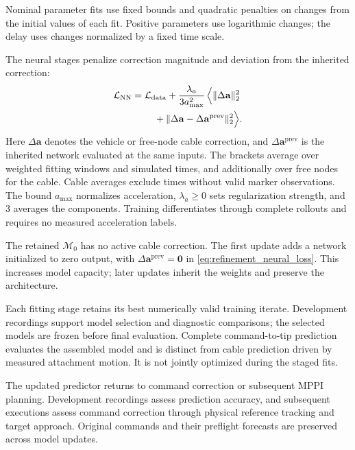 \documentclass[letterpaper, 10 pt, conference]{ieeeconf}
\begin{document}
Nominal parameter fits use fixed bounds and quadratic penalties
on changes from the initial values of each fit. Positive parameters
use logarithmic changes; the delay uses changes normalized by a
fixed time scale.

The neural stages penalize correction magnitude and deviation
from the inherited correction:
\begin{equation}
\begin{aligned}
\mathcal L_{\mathrm{NN}}
={}&\mathcal L_{\mathrm{data}}+\frac{\lambda_a}{3a_{\max}^2}\,
\Bigl\langle\|\Delta\mathbf a\|_2^2\\
&\quad+\|\Delta\mathbf a-\Delta\mathbf a^{\mathrm{prev}}\|_2^2\Bigr\rangle.
\end{aligned}
\label{eq:refinement_neural_loss}
\end{equation}
Here $\Delta\mathbf a$ denotes the vehicle or free-node cable
correction, and $\Delta\mathbf a^{\mathrm{prev}}$ is the
inherited network evaluated at the same inputs.
The brackets average over weighted fitting windows and simulated
times, and additionally over free nodes for the cable. Cable
averages exclude times without valid marker observations.
The bound $a_{\max}$ normalizes acceleration, $\lambda_a\geq0$
sets regularization strength, and $3$ averages the components.
Training differentiates through complete rollouts and requires
no measured acceleration labels.

The retained $\mathcal M_0$ has no active cable correction.
The first update adds a network initialized to zero output, with
$\Delta\mathbf a^{\mathrm{prev}}=\mathbf0$ in
\eqref{eq:refinement_neural_loss}. This increases model capacity;
later updates inherit the weights and preserve the architecture.

Each fitting stage retains its best numerically valid training
iterate. Development recordings support model selection and
diagnostic comparisons; the selected models are frozen before
final evaluation. Complete command-to-tip prediction evaluates
the assembled model and is distinct from cable prediction driven
by measured attachment motion. It is not jointly optimized during
the staged fits.

The updated predictor returns to command correction or subsequent
MPPI planning. Development recordings assess prediction accuracy,
and subsequent executions assess command correction through physical
reference tracking and target approach. Original commands and
their preflight forecasts are preserved across model updates.
\end{document}
